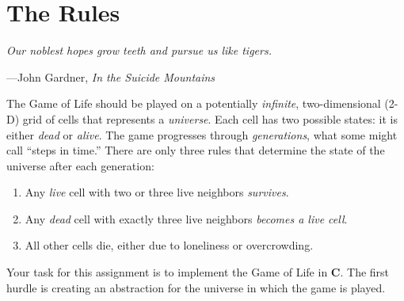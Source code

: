 \section{The Rules}

\textwidth
\epigraph{\emph{Our noblest hopes grow teeth and pursue us like tigers.}}
{---John Gardner, \emph{In the Suicide Mountains}}

The Game of Life should be played on a potentially \emph{infinite},
two-dimensional (2-D) grid of cells that represents a \emph{universe}. Each cell
has two possible states: it is either \emph{dead} or \emph{alive}. The game
progresses through \emph{generations}, what some might call ``steps in time.''
There are only three rules that determine the state of the universe after each
generation:

\begin{enumerate}
  \item Any \emph{live} cell with two or three live neighbors \emph{survives}.
  \item Any \emph{dead} cell with exactly three live neighbors \emph{becomes a live cell}.
  \item All other cells die, either due to loneliness or overcrowding.
\end{enumerate}

Your task for this assignment is to implement the Game of Life in \textbf{C}.
The first hurdle is creating an abstraction for the universe in which the game
is played.
